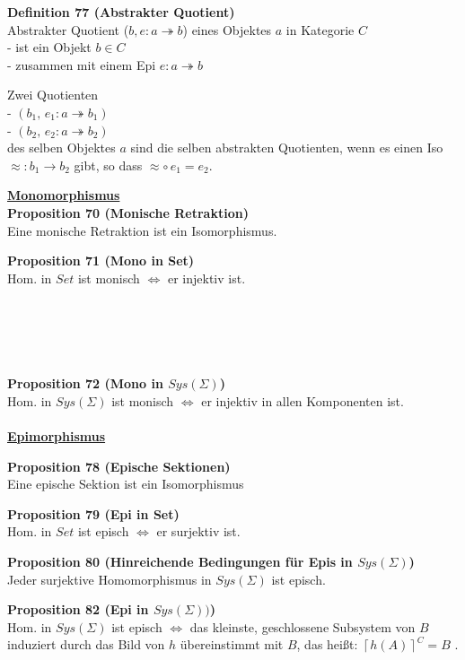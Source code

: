 \begin{multicols}{2}{}
\textbf{Definition 77 (Abstrakter Quotient)} \\
Abstrakter Quotient ($b,e: a \twoheadrightarrow b$)  eines Objektes $a$ in Kategorie $C$ \\ - ist ein Objekt $b \in C$ \\ - zusammen mit einem Epi $e:a \twoheadrightarrow b$

Zwei Quotienten \\ - $(b_{1},\, e_{1}:a \twoheadrightarrow b_1)$ \\
- $(b_{2},\, e_{2}:a \twoheadrightarrow b_2)$  \\ 
des selben Objektes $a$ sind die selben abstrakten Quotienten, wenn es einen Iso $\approx:b_{1}\rightarrow b_{2}$ gibt, so dass $ \approx \circ \, e_{1}=e_{2} $.


\end{multicols}
\newpage

\begin{multicols}{2}

\textbf{\underline{Monomorphismus}} \\

\textbf{Proposition 70 (Monische Retraktion)} \\
Eine monische Retraktion ist ein Isomorphismus.

\textbf{Proposition 71 (Mono in Set)} \\
Hom. in $Set$ ist monisch $\Leftrightarrow$  er injektiv ist. \\
\\
\\
\\
\\
\\

\textbf{Proposition 72 (Mono in $Sys(\Sigma)$)} \\
Hom. in $Sys(\Sigma)$ ist monisch $\Leftrightarrow$  er injektiv in allen Komponenten ist.
\\
\\

\columnbreak
\textbf{\underline{Epimorphismus}}

\textbf{Proposition 78 (Epische Sektionen)} \\
Eine epische Sektion ist ein Isomorphismus

\textbf{Proposition 79 (Epi in Set)} \\
Hom. in $Set$ ist episch $\Leftrightarrow$ er surjektiv ist.

\textbf{Proposition 80 (Hinreichende Bedingungen für Epis in $Sys(\Sigma)$)} \\
Jeder surjektive Homomorphismus in $Sys(\Sigma)$ ist episch.

\textbf{Proposition 82 (Epi in $Sys(\Sigma))$)} \\
Hom. in $Sys(\Sigma)$ ist episch $\Leftrightarrow$  das kleinste, geschlossene Subsystem von $B$ induziert durch das Bild von $h$ übereinstimmt mit $B$, das heißt: $\left\lceil h(A)\right\rceil ^{C}=B$ .

\end{multicols}


